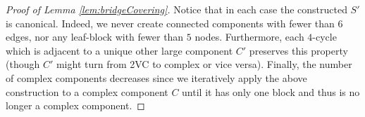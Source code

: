 \documentclass{article}
\newcounter{casei}
\newenvironment{caseanalysis}{\setcounter{casei}{0}}{}
\begin{document}
\begin{proof}[Proof of Lemma \ref{lem:bridgeCovering}]
\begin{caseanalysis}
\end{caseanalysis}

Notice that in each case the constructed $S'$ is canonical. Indeed, we never create connected components with fewer than $6$ edges, nor any leaf-block with fewer than $5$ nodes. Furthermore, each $4$-cycle which is adjacent to a unique other large component $C'$ preserves this property (though $C'$ might turn from 2VC to complex or vice versa). Finally, the number of complex components decreases since we iteratively apply the above construction to a complex component $C$ until it has only one block and thus is no longer a complex component.
\end{proof}


\end{document}
